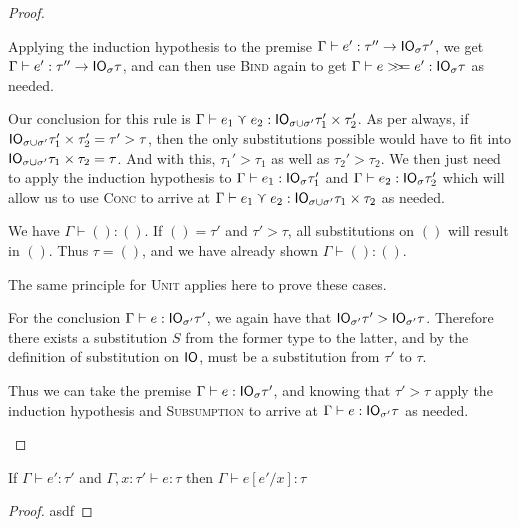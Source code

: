 \begin{proof}
\begin{description}
    Applying the induction hypothesis to the premise $\Gamma \vdash e' : \tau'' \rightarrow \mathsf{IO}_\sigma \tau'$,
    we get $\Gamma \vdash e' : \tau'' \rightarrow \mathsf{IO}_\sigma \tau$, and can then use \textsc{Bind}
    again to get $\Gamma \vdash e >\!\!>\!\!= e' : \mathsf{IO}_\sigma \tau$ as needed.
  \item[\textmd{\boxed{\textsc{Conc}}}]
    Our conclusion for this rule is $\Gamma \vdash e_1 \curlyvee e_2 : \mathsf{IO}_{\sigma \cup \sigma'} \tau_1'
    \times \tau_2'$. As per always, if $\mathsf{IO}_{\sigma \cup \sigma'} \tau_1' \times \tau_2' = \tau' > \tau$,
    then the only substitutions possible would have to fit into
    $\mathsf{IO}_{\sigma \cup \sigma'} \tau_1 \times \tau_2 = \tau$. And with this, $\tau_1' > \tau_1$ as well
    as $\tau_2' > \tau_2$. We then just need to apply the induction
    hypothesis to $\Gamma \vdash e_1 : \mathsf{IO}_\sigma \tau_1'$ and $\Gamma \vdash e_2 : \mathsf{IO}_\sigma \tau_2'$
    which will allow us to use \textsc{Conc} to arrive at $\Gamma \vdash e_1 \curlyvee
    e_2 : \mathsf{IO}_{\sigma \cup \sigma'} \tau_1 \times \tau_2$ as needed.
  \item[\textmd{\boxed{\textsc{Unit}}}]
    We have $\Gamma \vdash () : ()$. If $() = \tau'$ and $\tau' > \tau$, all
    substitutions on $()$ will result in $()$. Thus $\tau = ()$, and we
    have already shown $\Gamma \vdash () : ()$.
  \item[\textmd{\boxed{\textsc{ReadFile}, \textsc{ReadNet}}}]
    The same principle for \textsc{Unit} applies here to prove these
    cases.
  \item[\textmd{\boxed{\textsc{Subsumption}}}]
    For the conclusion $\Gamma \vdash e : \mathsf{IO}_{\sigma'} \tau'$, we again have that
    $\mathsf{IO}_{\sigma'} \tau' > \mathsf{IO}_{\sigma'} \tau$. Therefore there exists a substitution $S$
    from the former type to the latter, and by the definition of
    substitution on $\mathsf{IO}$, must be a substitution from $\tau'$ to $\tau$.

    Thus we can take the premise $\Gamma \vdash e : \mathsf{IO}_\sigma \tau'$, and knowing that
    $\tau' > \tau$ apply the induction hypothesis and \textsc{Subsumption}
    to arrive at $\Gamma \vdash e : \mathsf{IO}_{\sigma'} \tau$ as needed.
  \end{description}
\end{proof}

\begin{lemma}
  If $\Gamma \vdash e' : \tau'$ and $\Gamma, x : \tau' \vdash e : \tau$ then $\Gamma \vdash e [e' / x] : \tau$
\end{lemma}
\begin{proof}
  asdf
\end{proof}


